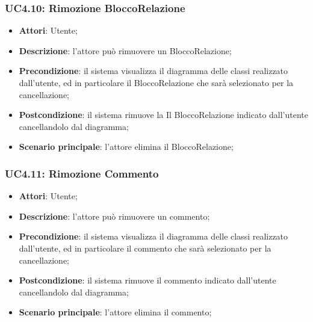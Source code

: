 \subsubsection{UC4.10: Rimozione BloccoRelazione}
\label{UC4.10}
\begin{itemize}
	\item \textbf{Attori}: Utente;
	\item \textbf{Descrizione}: l'attore può rimuovere un BloccoRelazione;
	\item \textbf{Precondizione}: il sistema visualizza il diagramma delle classi realizzato dall'utente, ed in particolare il BloccoRelazione che sarà selezionato per la cancellazione;
	\item \textbf{Postcondizione}: il sistema rimuove la Il BloccoRelazione indicato dall'utente cancellandolo dal diagramma;
	\item \textbf{Scenario principale}: l'attore elimina il BloccoRelazione;
\end{itemize}

\subsubsection{UC4.11: Rimozione Commento}
\label{UC4.11}
\begin{itemize}
	\item \textbf{Attori}: Utente;
	\item \textbf{Descrizione}: l'attore può rimuovere un commento;
	\item \textbf{Precondizione}: il sistema visualizza il diagramma delle classi realizzato dall'utente, ed in particolare il commento che sarà selezionato per la cancellazione;
	\item \textbf{Postcondizione}: il sistema rimuove il commento indicato dall'utente cancellandolo dal diagramma;
	\item \textbf{Scenario principale}: l'attore elimina il commento;
\end{itemize}

